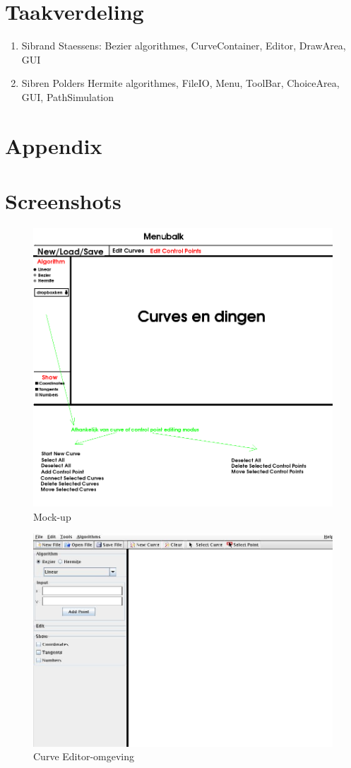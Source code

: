 \documentclass[a4paper,11pt,oneside, titlepage]{article}
\begin{document}
\section{Taakverdeling}
\begin{enumerate}
\item Sibrand Staessens:
       Bezier algorithmes, CurveContainer, Editor, DrawArea, GUI
\item Sibren Polders
       Hermite algorithmes, FileIO, Menu, ToolBar, ChoiceArea, GUI, PathSimulation
\end{enumerate}
\newpage
\section{Appendix}
\appendix
\section{Screenshots}
\begin{figure}[htbp]
\centering
\includegraphics[scale=0.4]{./mockup.png}
\caption{Mock-up}\label{mockup}
\end{figure}
\begin{figure}[htbp]
\centering
\includegraphics[scale=0.4]{./screenies/start.jpg}
\caption{Curve Editor-omgeving}\label{start}
\end{figure}
\end{document}
